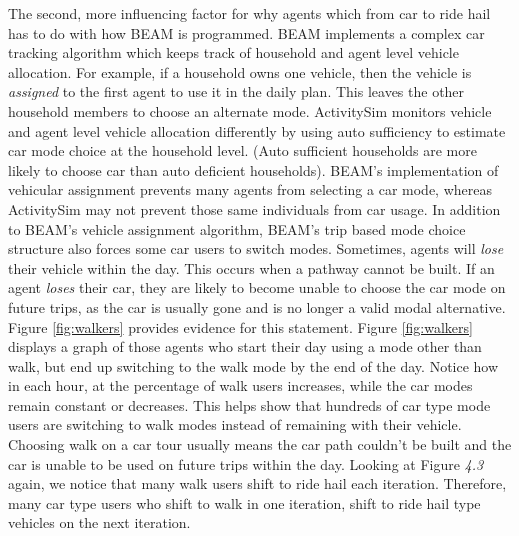 \documentclass[12pt, oneside, openright]{byuthesis}
\begin{document}
The second, more influencing factor for why agents which from car to ride hail has to do with how BEAM is programmed. BEAM implements a complex car tracking algorithm which keeps track of household and agent level vehicle allocation. For example, if a household owns one vehicle, then the vehicle is \emph{assigned} to the first agent to use it in the daily plan. This leaves the other household members to choose an alternate mode. ActivitySim monitors vehicle and agent level vehicle allocation differently by using auto sufficiency to estimate car mode choice at the household level. (Auto sufficient households are more likely to choose car than auto deficient households). BEAM's implementation of vehicular assignment prevents many agents from selecting a car mode, whereas ActivitySim may not prevent those same individuals from car usage. In addition to BEAM's vehicle assignment algorithm, BEAM's trip based mode choice structure also forces some car users to switch modes. Sometimes, agents will \emph{lose} their vehicle within the day. This occurs when a pathway cannot be built. If an agent \emph{loses} their car, they are likely to become unable to choose the car mode on future trips, as the car is usually gone and is no longer a valid modal alternative. Figure \ref{fig:walkers} provides evidence for this statement. Figure \ref{fig:walkers} displays a graph of those agents who start their day using a mode other than walk, but end up switching to the walk mode by the end of the day. Notice how in each hour, at the percentage of walk users increases, while the car modes remain constant or decreases. This helps show that hundreds of car type mode users are switching to walk modes instead of remaining with their vehicle. Choosing walk on a car tour usually means the car path couldn't be built and the car is unable to be used on future trips within the day. Looking at Figure \emph{4.3} again, we notice that many walk users shift to ride hail each iteration. Therefore, many car type users who shift to walk in one iteration, shift to ride hail type vehicles on the next iteration.
\end{document}
